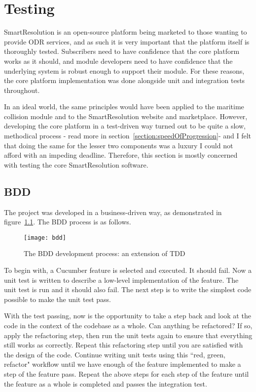 \chapter{Testing}

SmartResolution is an open-source platform being marketed to those wanting to provide ODR services, and as such it is very important that the platform itself is thoroughly tested. Subscribers need to have confidence that the core platform works as it should, and module developers need to have confidence that the underlying system is robust enough to support their module. For these reasons, the core platform implementation was done alongside unit and integration tests throughout.

In an ideal world, the same principles would have been applied to the maritime collision module and to the SmartResolution website and marketplace. However, developing the core platform in a test-driven way turned out to be quite a slow, methodical process - read more in section~\ref{section:speedOfProgression}- and I felt that doing the same for the lesser two components was a luxury I could not afford with an impeding deadline. Therefore, this section is mostly concerned with testing the core SmartResolution software.

\section{BDD}

The project was developed in a business-driven way, as demonstrated in figure~\ref{uml:bdd}. The BDD process is as follows.

\begin{figure}[h!]
  \centering
    \ifimages
    \texttt{[image: bdd]}
    \fi
  \caption{The BDD development process: an extension of TDD}
  \label{uml:bdd}
\end{figure}

To begin with, a Cucumber feature is selected and executed. It should fail. Now a unit test is written to describe a low-level implementation of the feature. The unit test is run and it should also fail. The next step is to write the simplest code possible to make the unit test pass.

With the test passing, now is the opportunity to take a step back and look at the code in the context of the codebase as a whole. Can anything be refactored? If so, apply the refactoring step, then run the unit tests again to ensure that everything still works as correctly. Repeat this refactoring step until you are satisfied with the design of the code. Continue writing unit tests using this ``red, green, refactor" workflow until we have enough of the feature implemented to make a step of the feature pass. Repeat the above steps for each step of the feature until the feature as a whole is completed and passes the integration test.

